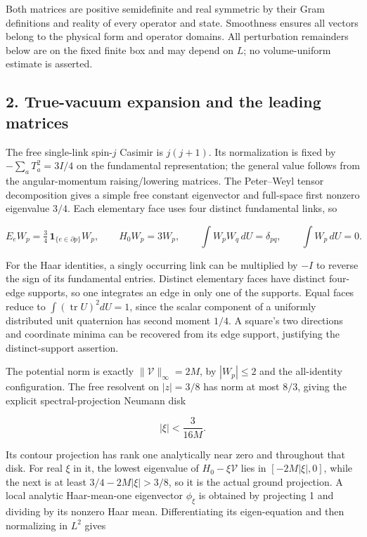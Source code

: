 \documentclass[
  11pt,
]{article}
\begin{document}
Both matrices are positive semidefinite and real symmetric by their Gram
definitions and reality of every operator and state. Smoothness ensures
all vectors belong to the physical form and operator domains. All
perturbation remainders below are on the fixed finite box and may depend
on \(L\); no volume-uniform estimate is asserted.

\subsection{2. True-vacuum expansion and the leading
matrices}\label{magnetic-part-4-true-vacuum-expansion-and-the-leading-matrices}

The free single-link spin-\(j\) Casimir is \(j(j+1)\). Its normalization
is fixed by \(-\sum_aT_a^2=3I/4\) on the fundamental representation; the
general value follows from the angular-momentum raising/lowering
matrices. The Peter--Weyl tensor decomposition gives a simple free
constant eigenvector and full-space first nonzero eigenvalue \(3/4\).
Each elementary face uses four distinct fundamental links, so

\[
E_eW_p=\tfrac34\,\mathbf1_{\{e\in\partial p\}}W_p,\qquad
H_0W_p=3W_p,\qquad
\int W_pW_q\,dU=\delta_{pq},\qquad \int W_p\,dU=0.
\tag{2.1}
\]

For the Haar identities, a singly occurring link can be multiplied by
\(-I\) to reverse the sign of its fundamental entries. Distinct
elementary faces have distinct four-edge supports, so one integrates an
edge in only one of the supports. Equal faces reduce to
\(\int(\operatorname{tr}U)^2dU=1\), since the scalar component of a
uniformly distributed unit quaternion has second moment \(1/4\). A
square's two directions and coordinate minima can be recovered from its
edge support, justifying the distinct-support assertion.

The potential norm is exactly \(\|\mathcal V\|_\infty=2M\), by
\(|W_p|\le2\) and the all-identity configuration. The free resolvent on
\(|z|=3/8\) has norm at most \(8/3\), giving the explicit
spectral-projection Neumann disk

\[
|\xi|<\frac3{16M}.
\tag{2.2}
\]

Its contour projection has rank one analytically near zero and
throughout that disk. For real \(\xi\) in it, the lowest eigenvalue of
\(H_0-\xi\mathcal V\) lies in \([-2M|\xi|,0]\), while the next is at
least \(3/4-2M|\xi|>3/8\), so it is the actual ground projection. A
local analytic Haar-mean-one eigenvector \(\phi_\xi\) is obtained by
projecting 1 and dividing by its nonzero Haar mean. Differentiating its
eigen-equation and then normalizing in \(L^2\) gives
\end{document}
